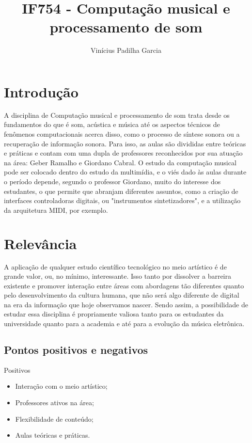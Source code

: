 \documentclass[a4paper]{article}
\title{IF754 - Computação musical e processamento de som}
\author{Vinícius Padilha Garcia}
\begin{document}
\maketitle

\section{Introdução}

	A disciplina de Computação musical e processamento de som trata desde os fundamentos do que é som, acústica e música até os aspectos técnicos de fenômenos computacionais acerca disso, como o processo de síntese sonora ou a recuperação de informação sonora. Para isso, as aulas são divididas entre teóricas e práticas e contam com uma dupla de professores reconhecidos por sua atuação na área: Geber Ramalho e Giordano Cabral. O estudo da computação musical pode ser colocado dentro do estudo da multimídia, e o viés dado às aulas durante o período depende, segundo o professor Giordano, muito do interesse dos estudantes, o que permite que abranjam diferentes assuntos, como a criação de interfaces controladoras digitais, ou "instrumentos sintetizadores", e a utilização da arquitetura MIDI, por exemplo.

\section{Relevância}

	A aplicação de qualquer estudo científico tecnológico no meio artístico é de grande valor, ou, no mínimo, interessante. Isso tanto por dissolver a barreira existente e promover interação entre áreas com abordagens tão diferentes quanto pelo desenvolvimento da cultura humana, que não será algo diferente de digital na era da informação que hoje observamos nascer. Sendo assim, a possibilidade de estudar essa disciplina é propriamente valiosa tanto para os estudantes da universidade quanto para a academia e até para a evolução da música eletrônica.

\subsection{Pontos positivos e negativos}

Positivos

\begin{itemize}
\item Interação com o meio artístico;
\item Professores ativos na área;
\item Flexibilidade de conteúdo;
\item Aulas teóricas e práticas.
\end{itemize}
\end{document}
